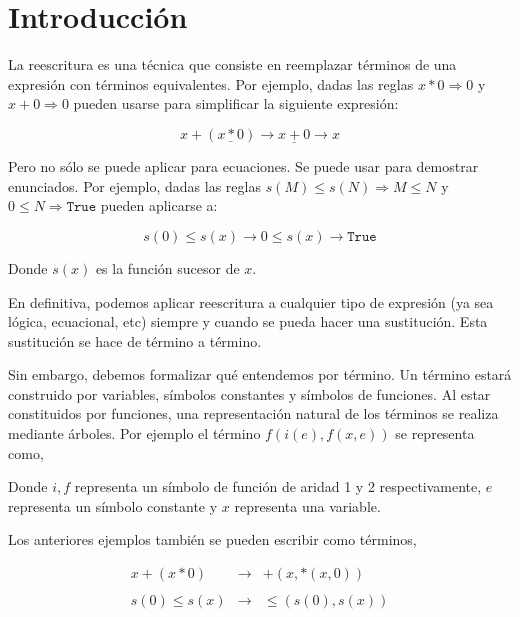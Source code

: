 \chapter{Introducción}

La reescritura es una técnica que consiste en reemplazar términos de
una expresión con términos equivalentes. Por ejemplo, dadas las reglas
$x * 0 \Rightarrow 0$ y $x + 0 \Rightarrow 0$ pueden usarse para
simplificar la siguiente expresión:

\[
x + (\underline{x*0}) \longrightarrow \underline{x + 0} \longrightarrow x
\]

Pero no sólo se puede aplicar para ecuaciones. Se puede usar para
demostrar enunciados. Por ejemplo, dadas las reglas
$s(M) \leq s(N) \Rightarrow M \leq N$ y
$0 \leq N \Rightarrow \texttt{True}$ pueden aplicarse a:

\[
  s(0) \leq s(x) \longrightarrow 0 \leq s(x) \longrightarrow
  \texttt{True}
\]

Donde $s(x)$ es la función sucesor de $x$.

En definitiva, podemos aplicar reescritura a cualquier tipo de
expresión (ya sea lógica, ecuacional, etc) siempre y cuando se pueda
hacer una sustitución. Esta sustitución se hace de término a término.

Sin embargo, debemos formalizar qué entendemos por término. Un término
estará construido por variables, símbolos constantes y símbolos de
funciones. Al estar constituidos por funciones, una representación
natural de los términos se realiza mediante árboles. Por ejemplo el
término $f(i(e),f(x,e))$ se representa como,

\begin{figure}[h]
  \centering
\end{figure}

Donde $i,f$ representa un símbolo de función de aridad 1 y 2
respectivamente, $e$ representa un símbolo constante y $x$ representa
una variable.

Los anteriores ejemplos también se pueden escribir como términos,

\[
  \begin{array}{rcl}
    x +(x*0) & \longrightarrow  & +(x,*(x,0)) \\ \\
    s(0) \leq s(x) & \longrightarrow & \leq(s(0),s(x)) \\ \\

  \end{array} 
\]

